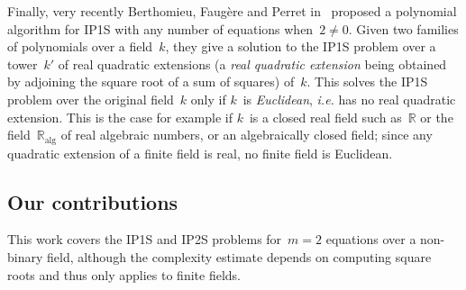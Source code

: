 \documentclass{lms}%
\def\transpose{\,{}^{\mathrm{t}\!}}
\begin{document}
Finally, very recently Berthomieu, Faugère and Perret
in~\cite{DBLP:journals/corr/BerthomieuFP13} proposed a polynomial
algorithm for IP1S with any number of equations when~$2 ≠ 0$. Given two
families of polynomials over a field~$k$, they give a solution to the
IP1S problem over a tower~$k'$ of real quadratic extensions (a \emph{real
quadratic extension} being obtained by adjoining the square root of a sum
of squares) of~$k$. This solves the IP1S problem over the original
field~$k$ only if $k$~is \emph{Euclidean}, \emph{i.e.} has no real
quadratic extension. This is the case for example if $k$~is a closed real
field such as~$ℝ$ or the field~$ℝ_{\mathrm{alg}}$ of real algebraic
numbers, or an algebraically closed field; since any quadratic extension
of a finite field is real, no finite field is Euclidean.



\subsection*{Our contributions}%
This work covers the IP1S and IP2S problems for~$m = 2$ equations over a
non-binary field, although the complexity estimate depends on
computing square roots and thus only applies to finite fields.
\end{document}
